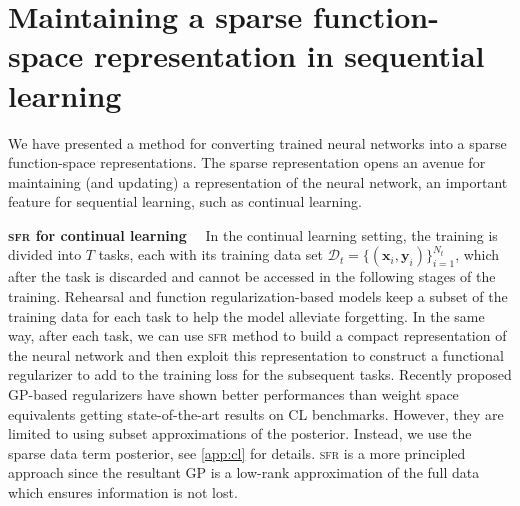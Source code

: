 \documentclass{article}
\renewcommand{\paragraph}[1]{{\bf #1}~~}
\newcommand{\our}{\textsc{sfr}\xspace}
\newcommand{\dataset}{\ensuremath{\mathcal{D}}}
\begin{document}
\section{Maintaining a sparse function-space representation in sequential learning}
\label{sec:sequential}
%
We have presented a method for converting trained neural networks into a sparse function-space representations. The sparse representation opens an avenue for maintaining (and updating) a representation of the neural network, an important feature for sequential learning, such as continual learning.



\paragraph{\our for continual learning}
In the continual learning setting, the training is divided into $T$ tasks, each with its training data set $\dataset_t = \{(\mathbf{x}_{i}, \mathbf{y}_{i})\}_{i=1}^{N_t}$, which after the task is discarded and cannot be accessed in the following stages of the training. Rehearsal and function regularization-based models keep a subset of the training data for each task to help the model alleviate forgetting. In the same way, after each task, we can use \our method to build a compact representation of the neural network and then exploit this representation to construct a functional regularizer to add to the training loss for the subsequent tasks. Recently proposed GP-based regularizers \cite{ pan2020continual, rudner2022continual} have shown better performances than weight space equivalents getting state-of-the-art results on CL benchmarks. However, they are limited to using subset approximations of the posterior. Instead, we use the sparse data term posterior, see \cref{app:cl} for details.
\our is a more principled approach since the resultant GP is a low-rank approximation of the full data which ensures information is not lost. %
\end{document}
